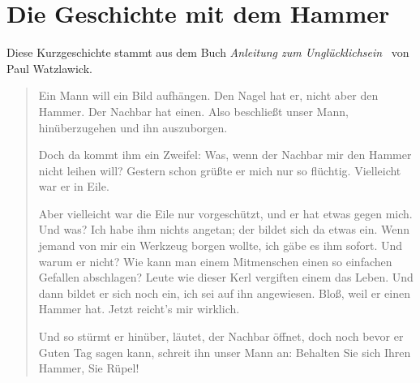 \section{Die Geschichte mit dem Hammer}
\label{hammer-geschichte}

Diese Kurzgeschichte stammt aus dem Buch \emph{Anleitung zum Unglücklichsein}~\cite{anleitung-zum-ungluecklichsein} von Paul Watzlawick.

\begin{quote}

    Ein Mann will ein Bild aufhängen. Den Nagel hat er, nicht aber den Hammer. Der Nachbar hat einen. Also beschließt unser Mann, hinüberzugehen und ihn auszuborgen.

    Doch da kommt ihm ein Zweifel: Was, wenn der Nachbar mir den Hammer nicht leihen will? Gestern schon grüßte er mich nur so flüchtig. Vielleicht war er in Eile.

    Aber vielleicht war die Eile nur vorgeschützt, und er hat etwas gegen mich. Und was? Ich habe ihm nichts angetan; der bildet sich da etwas ein. Wenn jemand von mir ein Werkzeug borgen wollte, ich gäbe es ihm sofort. Und warum er nicht? Wie kann man einem Mitmenschen einen so einfachen Gefallen abschlagen? Leute wie dieser Kerl vergiften einem das Leben. Und dann bildet er sich noch ein, ich sei auf ihn angewiesen. Bloß, weil er einen Hammer hat. Jetzt reicht's mir wirklich.

    Und so stürmt er hinüber, läutet, der Nachbar öffnet, doch noch bevor er \glqq Guten Tag\grqq{} sagen kann, schreit ihn unser Mann an: \glqq Behalten Sie sich Ihren Hammer, Sie Rüpel!\grqq

\end{quote}
